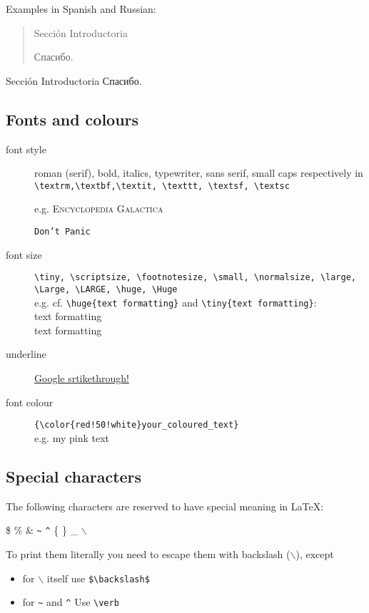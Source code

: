 \documentclass[a4paper,11pt]{article}
\begin{document}
Examples in Spanish and Russian:

\begin{center}
	\begin{quote}
		\foreignlanguage{spanish}{Sección Introductoria} 
		
		\foreignlanguage{russian}{Спасибо.}
	\end{quote}
	
	Sección Introductoria
	Спасибо.
\end{center}

\subsection{Fonts and colours}

\begin{description}
	\item[font style] roman (serif), bold, italics, typewriter, sans serif, small caps respectively in \\
	\verb|\textrm,\textbf,\textit, \texttt, \textsf, \textsc|
	
	e.g. \textsc{Encyclopedia Galactica} 
	
	\texttt{Don't Panic}
	
	\item[font size] \verb|\tiny, \scriptsize, \footnotesize, \small, \normalsize, \large, \Large, \LARGE, \huge, \Huge| \\
	e.g. cf. \verb|\huge{text formatting}| and \verb|\tiny{text formatting}|: \\
	\huge{text formatting} \\
	\tiny{text formatting}
	\normalsize
	
	\item[underline] \underline{Google srtikethrough!}
	
	\item[font colour] \verb|{\color{red!50!white}your_coloured_text}| \\
	 e.g. {\color{red!50!white}my pink text}
 
\end{description}


\subsection{Special characters}
The following characters are reserved to have special meaning in \LaTeX:

\$ \% \& \verb|~| \verb|^| \{ \} \_ $\backslash$ 

To print them literally you need to escape them with backslash ($\backslash$), except
\begin{itemize}
	\item for $\backslash$ itself use \verb|$\backslash$|
	\item for \verb|~| and \verb|^| Use \verb|\verb| 
\end{itemize}
\end{document}
